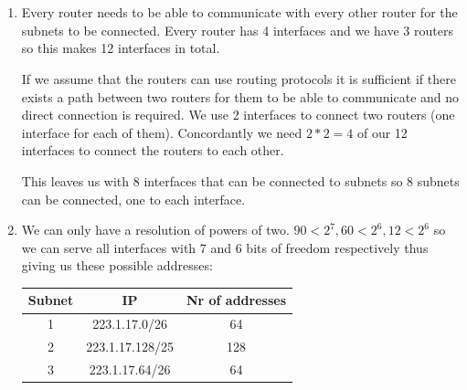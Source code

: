 \documentclass[12pt, a4paper]{article}
\begin{document}
\section{} %
\begin{enumerate}[a]
	\item %
	Every router needs to be able to communicate with every other router for the subnets to be connected. Every router has 4 interfaces and we have 3 routers so this makes 12 interfaces in total.

	If we assume that the routers can use routing protocols it is sufficient if there exists a path between two routers for them to be able to communicate and no direct connection is required. We use 2 interfaces to connect two routers (one interface for each of them). Concordantly we need $2 * 2 = 4$ of our 12 interfaces to connect the routers to each other.

	This leaves us with 8 interfaces that can be connected to subnets so 8 subnets can be connected, one to each interface.

	\item %
	We can only have a resolution of powers of two. $90 < 2^7, 60 < 2^6, 12 < 2^6$ so we can serve all interfaces with 7 and 6 bits of freedom respectively thus giving us these possible addresses:

	\begin{tabular}{|c|c|c|}
		\hline
		Subnet & IP & Nr of addresses\\\hline
		1 & 223.1.17.0/26 & 64\\
		2 & 223.1.17.128/25 & 128\\
		3 & 223.1.17.64/26 & 64\\
		\hline
	\end{tabular}

\end{enumerate}
\end{document}
